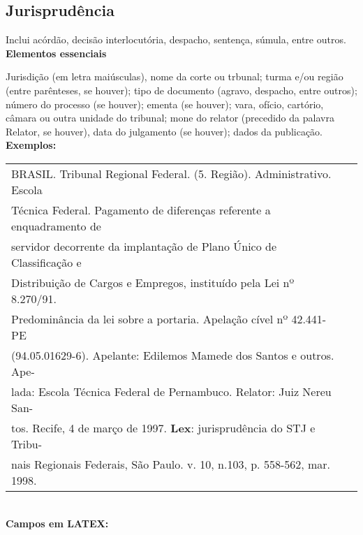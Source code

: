 \subsection{Jurisprudência}

Inclui acórdão, decisão interlocutória, despacho, sentença, súmula, entre outros. \\

\textbf{Elementos essenciais}

Jurisdição (em letra maiúsculas), nome da corte ou trbunal; turma e/ou região (entre parênteses, se houver); tipo de documento (agravo, despacho, entre outros); número do processo (se houver); ementa (se houver); vara, ofício, cartório, câmara ou outra unidade do tribunal; mone do relator (precedido da palavra Relator, se houver), data do julgamento (se houver); dados da publicação. \\

\textbf{Exemplos:} \\


\begin{tabular}{|l|c|} \hline
	BRASIL. Tribunal Regional Federal. (5. Região). Administrativo. Escola\\
	Técnica Federal. Pagamento de diferenças referente a enquadramento de \\
	servidor decorrente da implantação de Plano Único de Classificação e \\
	Distribuição de Cargos e Empregos, instituído pela Lei nº 8.270/91. \\
	Predominância da lei sobre a portaria. Apelação cível nº 42.441-PE \\
	(94.05.01629-6). Apelante: Edilemos Mamede dos Santos e outros. Ape-\\
	lada: Escola Técnica Federal de Pernambuco. Relator: Juiz Nereu San-\\
	tos. Recife, 4 de março de 1997. \textbf{Lex}: jurisprudência do STJ e Tribu-\\
	nais Regionais Federais, São Paulo. v. 10, n.103, p. 558-562, mar. 1998. \\\hline
\end{tabular} \\

\textbf{Campos em LATEX:} 

